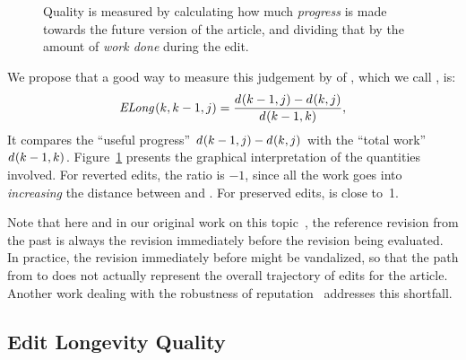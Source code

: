 \begin{figure}
\centering
{}
\caption{Quality is measured by calculating how much \textit{progress}
	is made towards the future version of the article,
	and dividing that by the amount of \textit{work done}
	during the edit.}
\label{fig-editlong}
\end{figure}

We propose that a good way to measure this judgement
by  of ,
which we call , is:
\begin{equation}
\esurv{}{k,k-1,j} = \frac{\dist{}{k-1,j} - \dist{}{k,j}}
                        {\dist{}{k-1,k}},
\label{eq:esurv}
\end{equation}
It compares the ``useful progress''
$d_{}(k-1,j) - d_{}(k,j)$
with the ``total work''
$d_{}(k-1,k)$.
Figure~\ref{fig-editlong} presents the graphical interpretation
of the quantities involved.
  For reverted edits, the ratio 
  is $-1$, since all the work
  goes into \textit{increasing} the distance between  and .
  For preserved edits,  is close to~1.

Note that here and in our original work on
this topic~\cite{Adler2007}, the reference revision from the past is always
the revision immediately before the revision being evaluated.
In practice, the revision immediately before might be vandalized,
so that the path from  to  does not
actually represent the overall trajectory of edits for the
article.
Another work dealing with
the robustness of reputation~\cite{Chatterjee2008} addresses this
shortfall.

\subsection{Edit Longevity Quality}

